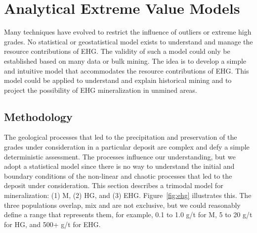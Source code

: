 

\FloatBarrier
\section{Analytical Extreme Value Models}
\label{sec:02analytical}

Many techniques have evolved to restrict the influence of outliers or extreme high grades. No statistical or geostatistical model exists to understand and manage the resource contributions of \gls{EHG}. The validity of such a model could only be established based on many data or bulk mining. The idea is to develop a simple and intuitive model that accommodates the resource contributions of \gls{EHG}. This model could be applied to understand and explain historical mining and to project the possibility of \gls{EHG} mineralization in unmined areas.

\FloatBarrier
\subsection{Methodology}
\label{subsec:02methodehg}

The geological processes that led to the precipitation and preservation of the grades under consideration in a particular deposit are complex and defy a simple deterministic assessment. The processes influence our understanding, but we adopt a statistical model since there is no way to understand the initial and boundary conditions of the non-linear and chaotic processes that led to the deposit under consideration. This section describes a trimodal model for mineralization: (1) \acrfull{M}, (2) \acrfull{HG}, and (3) \acrfull{EHG}. Figure~\ref{fig:ehg} illustrates this. The three populations overlap, mix and are not exclusive, but we could reasonably define a range that represents them, for example, 0.1 to 1.0 g/t for \gls{M}, 5 to 20 g/t for \gls{HG}, and 500+ g/t for \gls{EHG}.

